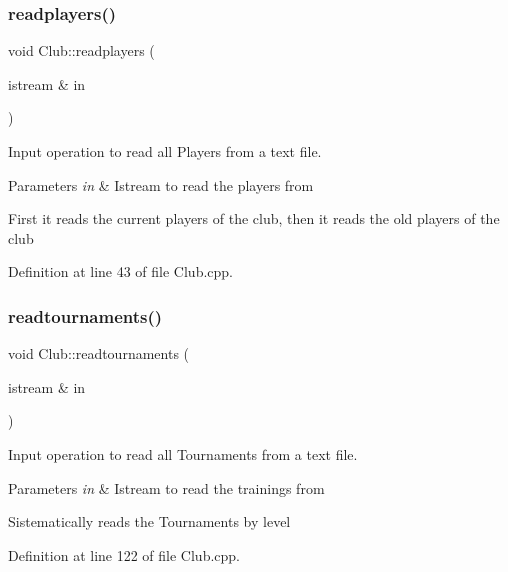 \hypertarget{class_club_a8bae0203ecc348fa338ff5fcfd0cd6fb}{}\label{class_club_a8bae0203ecc348fa338ff5fcfd0cd6fb} 
\subsubsection{\texorpdfstring{readplayers()}{readplayers()}}
{\footnotesize\ttfamily void Club\+::readplayers (\begin{DoxyParamCaption}\item[{istream \&}]{in }\end{DoxyParamCaption})}



Input operation to read all Players from a text file. 


\begin{DoxyParams}{Parameters}
{\em in} & Istream to read the players from\\
\hline
\end{DoxyParams}
First it reads the current players of the club, then it reads the old players of the club 

Definition at line 43 of file Club.\+cpp.

\hypertarget{class_club_ae7453aa640951df46424975ecfcbbbca}{}\label{class_club_ae7453aa640951df46424975ecfcbbbca} 
\subsubsection{\texorpdfstring{readtournaments()}{readtournaments()}}
{\footnotesize\ttfamily void Club\+::readtournaments (\begin{DoxyParamCaption}\item[{istream \&}]{in }\end{DoxyParamCaption})}



Input operation to read all Tournaments from a text file. 


\begin{DoxyParams}{Parameters}
{\em in} & Istream to read the trainings from\\
\hline
\end{DoxyParams}
Sistematically reads the Tournaments by level 

Definition at line 122 of file Club.\+cpp.

\hypertarget{class_club_a918827ec97985e5f98d471f116098902}{}\label{class_club_a918827ec97985e5f98d471f116098902} 
